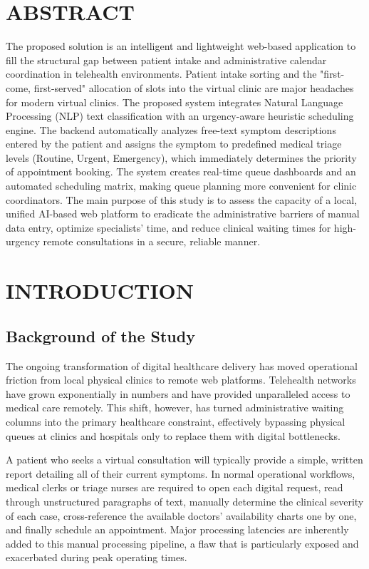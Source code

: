 \documentclass[12pt,a4paper]{report}
\begin{document}
\chapter*{ABSTRACT}
The proposed solution is an intelligent and lightweight web-based application to fill the structural gap between patient intake and administrative calendar coordination in telehealth environments. Patient intake sorting and the "first-come, first-served" allocation of slots into the virtual clinic are major headaches for modern virtual clinics. The proposed system integrates Natural Language Processing (NLP) text classification with an urgency-aware heuristic scheduling engine. The backend automatically analyzes free-text symptom descriptions entered by the patient and assigns the symptom to predefined medical triage levels (Routine, Urgent, Emergency), which immediately determines the priority of appointment booking. The system creates real-time queue dashboards and an automated scheduling matrix, making queue planning more convenient for clinic coordinators. The main purpose of this study is to assess the capacity of a local, unified AI-based web platform to eradicate the administrative barriers of manual data entry, optimize specialists' time, and reduce clinical waiting times for high-urgency remote consultations in a secure, reliable manner.

\tableofcontents
\listoftables
\listoffigures

\clearpage
{}

\chapter{INTRODUCTION}

\section{Background of the Study}
The ongoing transformation of digital healthcare delivery has moved operational friction from local physical clinics to remote web platforms. Telehealth networks have grown exponentially in numbers and have provided unparalleled access to medical care remotely. This shift, however, has turned administrative waiting columns into the primary healthcare constraint, effectively bypassing physical queues at clinics and hospitals only to replace them with digital bottlenecks. 

A patient who seeks a virtual consultation will typically provide a simple, written report detailing all of their current symptoms. In normal operational workflows, medical clerks or triage nurses are required to open each digital request, read through unstructured paragraphs of text, manually determine the clinical severity of each case, cross-reference the available doctors' availability charts one by one, and finally schedule an appointment. Major processing latencies are inherently added to this manual processing pipeline, a flaw that is particularly exposed and exacerbated during peak operating times.
\end{document}
